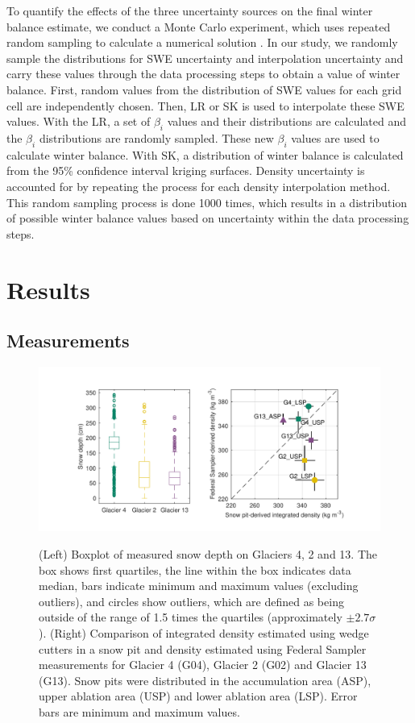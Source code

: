 \documentclass[twocolumn, letterpaper]{igs}
\begin{document}
To quantify the effects of the three uncertainty sources on the final winter balance estimate, we conduct a Monte Carlo experiment, which uses repeated random sampling to calculate a numerical solution \citep{Metropolis1949}. In our study, we randomly sample the distributions for SWE uncertainty and interpolation uncertainty and carry these values through the data processing steps to obtain a value of winter balance. First, random values from the distribution of SWE values for each grid cell are independently chosen. Then, LR or SK is used to interpolate these SWE values. With the LR, a set of $\beta_i$ values and their distributions are calculated and the $\beta_i$ distributions are randomly sampled. These new $\beta_i$ values are used to calculate winter balance. With SK, a distribution of winter balance is calculated from the 95\% confidence interval kriging surfaces. Density uncertainty is accounted for by repeating the process for each density interpolation method. This random sampling process is done 1000 times, which results in a distribution of possible winter balance values based on uncertainty within the data processing steps.

\section{Results}

\subsection{Measurements}

\begin{figure}
	\centering
	\includegraphics[width =\textwidth]{DepthBoxplot_SPvsFS.pdf}\\
	\caption{(Left) Boxplot of measured snow depth on Glaciers 4, 2 and 13. The box shows first quartiles, the line within the box indicates data median, bars indicate minimum and maximum values (excluding outliers), and circles show outliers, which are defined as being outside of the range of 1.5 times the quartiles (approximately $\pm2.7\sigma$). (Right) Comparison of integrated density estimated using wedge cutters in a snow pit and density estimated using Federal Sampler measurements for Glacier 4 (G04), Glacier 2 (G02) and Glacier 13 (G13). Snow pits were distributed in the accumulation area (ASP), upper ablation area (USP) and lower ablation area (LSP). Error bars are minimum and maximum values.}
	\label{fig:DepthBoxplot_SPvsFS}
\end{figure}
\end{document}
